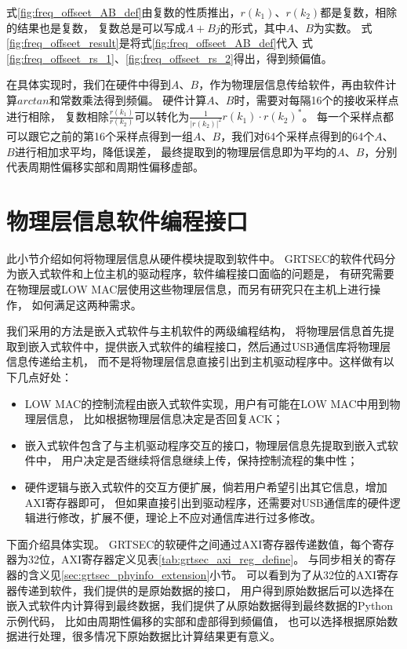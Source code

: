 	式\ref{fig:freq_offseet_AB_def}由复数的性质推出，$r(k_1)$、$r(k_2)$都是复数，相除的结果也是复数，
	复数总是可以写成$A + Bj$的形式，其中$A$、$B$为实数。
	式\ref{fig:freq_offseet_result}是将式\ref{fig:freq_offseet_AB_def}代入
	式\ref{fig:freq_offseet_rs_1}、\ref{fig:freq_offseet_rs_2}得出，得到频偏值。

	在具体实现时，我们在硬件中得到$A$、$B$，作为物理层信息传给软件，再由软件计算$arctan$和常数乘法得到频偏。
	硬件计算$A$、$B$时，需要对每隔16个的接收采样点进行相除，
	复数相除$\frac{r(k_1)}{r(k_2)}$可以转化为$\frac{1}{|r(k_2)|^2}r(k_1) \cdot r(k_2)^* $。
	每一个采样点都可以跟它之前的第16个采样点得到一组$A$、$B$，我们对64个采样点得到的64个$A$、$B$进行相加求平均，降低误差，
	最终提取到的物理层信息即为平均的$A$、$B$，分别代表周期性偏移实部和周期性偏移虚部。

	\section{物理层信息软件编程接口}\label{sec:grtsec_phyinfo_api}
	此小节介绍如何将物理层信息从硬件模块提取到软件中。
	GRTSEC的软件代码分为嵌入式软件和上位主机的驱动程序，软件编程接口面临的问题是，
	有研究需要在物理层或LOW MAC层使用这些物理层信息，而另有研究只在主机上进行操作，
	如何满足这两种需求。

	我们采用的方法是嵌入式软件与主机软件的两级编程结构，
	将物理层信息首先提取到嵌入式软件中，提供嵌入式软件的编程接口，然后通过USB通信库将物理层信息传递给主机，
	而不是将物理层信息直接引出到主机驱动程序中。这样做有以下几点好处：
		\begin{itemize}
			\item LOW MAC的控制流程由嵌入式软件实现，用户有可能在LOW MAC中用到物理层信息，
			比如根据物理层信息决定是否回复ACK；
			\item 嵌入式软件包含了与主机驱动程序交互的接口，物理层信息先提取到嵌入式软件中，
			用户决定是否继续将信息继续上传，保持控制流程的集中性；
			\item 硬件逻辑与嵌入式软件的交互方便扩展，倘若用户希望引出其它信息，增加AXI寄存器即可，
			但如果直接引出到驱动程序，还需要对USB通信库的硬件逻辑进行修改，扩展不便，理论上不应对通信库进行过多修改。
		\end{itemize}

	下面介绍具体实现。
	GRTSEC的软硬件之间通过AXI寄存器传递数值，每个寄存器为32位，AXI寄存器定义见表\ref{tab:grtsec_axi_reg_define}。
	与同步相关的寄存器的含义见\ref{sec:grtsec_phyinfo_extension}小节。
	可以看到为了从32位的AXI寄存器传递到软件，我们提供的是原始数据的接口，
	用户得到原始数据后可以选择在嵌入式软件内计算得到最终数据，我们提供了从原始数据得到最终数据的Python示例代码，
	比如由周期性偏移的实部和虚部得到频偏值，
	也可以选择根据原始数据进行处理，很多情况下原始数据比计算结果更有意义。

